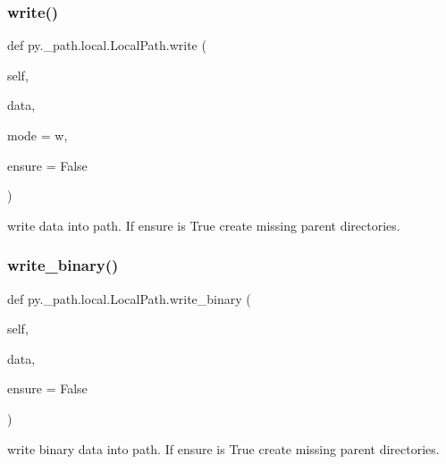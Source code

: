 \subsubsection{\texorpdfstring{write()}{write()}}
{\footnotesize\ttfamily def py.\+\_\+path.\+local.\+Local\+Path.\+write (\begin{DoxyParamCaption}\item[{}]{self,  }\item[{}]{data,  }\item[{}]{mode = {\ttfamily \textquotesingle{}w\textquotesingle{}},  }\item[{}]{ensure = {\ttfamily False} }\end{DoxyParamCaption})}

\begin{DoxyVerb}write data into path.   If ensure is True create
missing parent directories.
\end{DoxyVerb}
 \mbox{\label{classpy_1_1__path_1_1local_1_1_local_path_ad7fa1cb7006e4059c1f75369e902b7fb}} 
\subsubsection{\texorpdfstring{write\+\_\+binary()}{write\_binary()}}
{\footnotesize\ttfamily def py.\+\_\+path.\+local.\+Local\+Path.\+write\+\_\+binary (\begin{DoxyParamCaption}\item[{}]{self,  }\item[{}]{data,  }\item[{}]{ensure = {\ttfamily False} }\end{DoxyParamCaption})}

\begin{DoxyVerb}write binary data into path.   If ensure is True create
missing parent directories.
\end{DoxyVerb}
 \mbox{\label{classpy_1_1__path_1_1local_1_1_local_path_aeb4be3f7dfd24c476b2d47fe04f9aec3}} 
